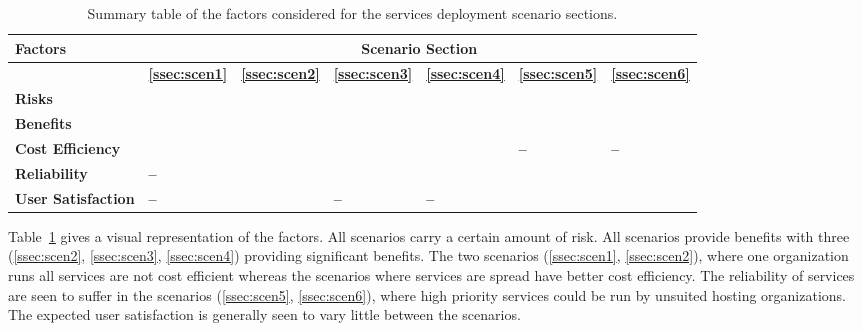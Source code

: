 \documentclass[12pt,a4paper]{article}
\newcommand{\cmark}{\ding{51}}%
\newcommand{\xmark}{\ding{55}}%
\newcommand{\SP}{\cellcolor{green!75} \bf \cmark} %
\newcommand{\MP}{\cellcolor{green!50} \bf \cmark} %
\newcommand{\NU}{\cellcolor{yellow!25} \bf --} %
\newcommand{\MN}{\cellcolor{red!50} \bf \xmark} %
\newcommand{\SN}{\cellcolor{red!75} \bf \xmark} %
\newcommand{\SP}{\cellcolor{blue!75} \bf \hspace{\facc\colwid}\cmark} %
\newcommand{\MP}{\cellcolor{blue!25} \bf \hspace{\facc\colwid}\cmark} %
\newcommand{\NU}{\cellcolor{yellow!25} \bf \hspace{\facc\colwid}--} %
\newcommand{\MN}{\cellcolor{red!25} \bf \hspace{\facc\colwid}\xmark} %
\newcommand{\SN}{\cellcolor{red!75} \bf \hspace{\facc\colwid}\xmark} %
\begin{document}
\begin{table} \centering
\begin{tabular}{p{5cm}|p{\colwid} p{\colwid} p{\colwid} p{\colwid} p{\colwid} p{\colwid}}
{\bf \Large Factors}& \multicolumn{6}{c}{\bf \Large \bf Scenario Section} \\[\pdd] %
  \hline
           & \bf \hspace{\faccc\colwid}\ref{ssec:scen1} & 
             \bf \hspace{\faccc\colwid}\ref{ssec:scen2} & 
             \bf \hspace{\faccc\colwid}\ref{ssec:scen3} & 
             \bf \hspace{\faccc\colwid}\ref{ssec:scen4} & 
             \bf \hspace{\faccc\colwid}\ref{ssec:scen5} & 
             \bf \hspace{\faccc\colwid}\ref{ssec:scen6} \\[\pdd]
\large \bf Risks             & \SN & \SN & \SN & \MN & \SN & \SN
\\[\pdd]
\large \bf Benefits          & \MP & \SP & \SP & \SP & \MP & \MP
\\[\pdd]
\large \bf Cost Efficiency   & \MN & \SN & \MP & \MP & \NU & \NU
\\[\pdd]
\large \bf Reliability       & \NU & \MP & \MP & \MP & \MN & \MN
\\[\pdd]
\large \bf User Satisfaction & \NU & \MN & \NU & \NU & \MN & \MN
\end{tabular}
\caption{Summary table of the factors considered for the \ED services deployment scenario sections.}
\label{tab:summary}
\end{table}


Table~\ref{tab:summary} gives a visual representation of the factors.
All scenarios carry a certain amount of risk.
All scenarios provide benefits with three (\ref{ssec:scen2}, \ref{ssec:scen3}, \ref{ssec:scen4}) providing significant benefits.
The two scenarios (\ref{ssec:scen1}, \ref{ssec:scen2}), where one organization runs all services are not cost efficient whereas the scenarios where services are spread have better cost efficiency.
The reliability of services are seen to suffer in the scenarios (\ref{ssec:scen5}, \ref{ssec:scen6}), where high priority services could be run by unsuited hosting organizations.
The expected user satisfaction is generally seen to vary little between the scenarios.
\end{document}
